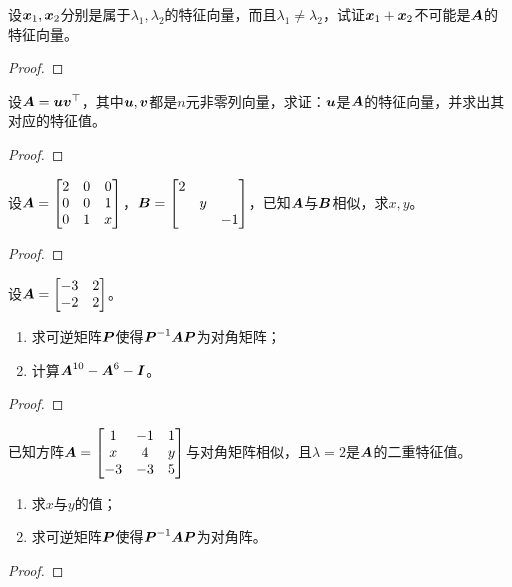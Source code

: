 \begin{problem}
设\(\boldsymbol{x}_1,\boldsymbol{x}_2\)分别是属于\(\lambda_1,\lambda_2\)的特征向量，而且\(\lambda_1\neq\lambda_2\)，试证\(\boldsymbol{x}_1+\boldsymbol{x}_2\)不可能是\(\boldsymbol{A}\)的特征向量。
\end{problem}
\begin{proof}

\end{proof}

\setcounter{problem}{23}
\begin{problem}
设\(\boldsymbol{A}=\boldsymbol{u}\boldsymbol{v}^\top\)，其中\(\boldsymbol{u},\boldsymbol{v}\)都是\(n\)元非零列向量，求证：\(\boldsymbol{u}\)是\(\boldsymbol{A}\)的特征向量，并求出其对应的特征值。
\end{problem}
\begin{proof}

\end{proof}

\begin{problem}
设\(\boldsymbol{A}=\begin{bmatrix}2&0&0\\0&0&1\\0&1&x\end{bmatrix}\)，\(\boldsymbol{B}=\begin{bmatrix}2&&\\&y&\\&&-1\end{bmatrix}\)，已知\(\boldsymbol{A}\)与\(\boldsymbol{B}\)相似，求\(x,y\)。
\end{problem}
\begin{proof}

\end{proof}

\begin{problem}
设\(\boldsymbol{A}=\begin{bmatrix}-3&2\\-2&2\end{bmatrix}\)。
\begin{enumerate}
    \item 求可逆矩阵\(\boldsymbol{P}\)使得\({\boldsymbol{P}}^{-1}\boldsymbol{A}\boldsymbol{P}\)为对角矩阵；
    \item 计算\(\boldsymbol{A}^{10}-\boldsymbol{A}^6-\boldsymbol{I}\)。
\end{enumerate}
\end{problem}
\begin{proof}

\end{proof}

\begin{problem}
已知方阵\(\boldsymbol{A}=\begin{bmatrix}1&-1&1\\x&4&y\\-3&-3&5\end{bmatrix}\)与对角矩阵相似，且\(\lambda=2\)是\(\boldsymbol{A}\)的二重特征值。
\begin{enumerate}
    \item 求\(x\)与\(y\)的值；
    \item 求可逆矩阵\(\boldsymbol{P}\)使得\({\boldsymbol{P}}^{-1}\boldsymbol{A}\boldsymbol{P}\)为对角阵。
\end{enumerate}
\end{problem}
\begin{proof}

\end{proof}

